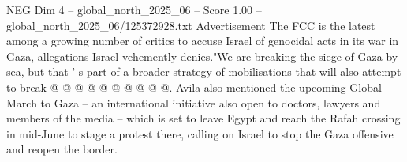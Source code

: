 \begin{textsample}{NEG Dim 4 – global\_north\_2025\_06 – Score 1.00 – global\_north\_2025\_06/125372928.txt}
Advertisement The FCC is the latest among a growing number of critics to accuse Israel of genocidal acts in its war in Gaza, allegations Israel vehemently denies."We are breaking the siege of Gaza by sea, but that ' s part of a broader strategy of mobilisations that will also attempt to break @ @ @ @ @ @ @ @ @ @.
Avila also mentioned the upcoming Global March to Gaza -- an international initiative also open to doctors, lawyers and members of the media -- which is set to leave Egypt and reach the Rafah crossing in mid-June to stage a protest there, calling on Israel to stop the Gaza offensive and reopen the border.

\end{textsample}
